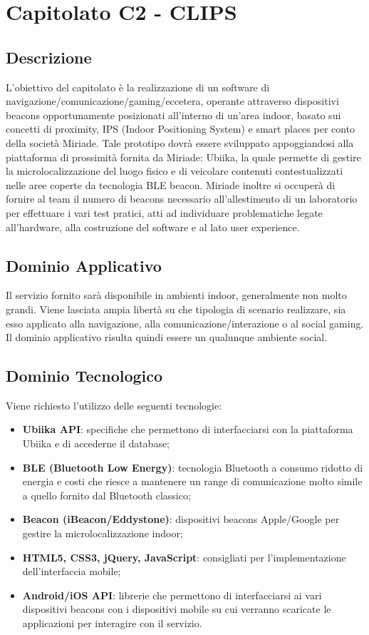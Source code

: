 \section{Capitolato C2 - CLIPS}
\subsection{Descrizione}
L'obiettivo del capitolato è la realizzazione di un software di navigazione/comunicazione/gaming/eccetera, operante attraverso dispositivi beacons opportunamente posizionati all'interno di un'area indoor, basato sui concetti di proximity, IPS (Indoor Positioning System) e smart places per conto della società Miriade. Tale prototipo dovrà essere sviluppato appoggiandosi alla piattaforma di prossimità fornita da Miriade: Ubiika, la quale permette di gestire la microlocalizzazione del luogo fisico e di veicolare contenuti contestualizzati nelle aree coperte da tecnologia BLE beacon. Miriade inoltre si occuperà di fornire al team il numero di beacons necessario all'allestimento di un laboratorio per effettuare i vari test pratici, atti ad individuare problematiche legate all'hardware, alla costruzione del software e al lato user experience.     

\subsection{Dominio Applicativo}
Il servizio fornito sarà disponibile in ambienti indoor, generalmente non molto grandi. Viene lasciata ampia libertà su che tipologia di scenario realizzare, sia esso applicato alla navigazione, alla comunicazione/interazione o al social gaming. Il dominio applicativo risulta quindi essere un qualunque ambiente social. 

\subsection{Dominio Tecnologico}
Viene richiesto l'utilizzo delle seguenti tecnologie:
\begin{itemize}
\item \textbf{Ubiika API}: specifiche che permettono di interfacciarsi con la piattaforma Ubiika e di accederne il database;
\item \textbf{BLE (Bluetooth Low Energy)}: tecnologia Bluetooth a consumo ridotto di energia e costi che riesce a mantenere un range di comunicazione molto simile a quello fornito dal Bluetooth classico;
\item \textbf{Beacon (iBeacon/Eddystone)}: dispositivi beacons Apple/Google per gestire la microlocalizzazione indoor;
\item \textbf{HTML5, CSS3, jQuery, JavaScript}: consigliati per l'implementazione dell'interfaccia mobile;
\item \textbf{Android/iOS API}: librerie che permettono di interfacciarsi ai vari dispositivi beacons con i dispositivi mobile su cui verranno scaricate le applicazioni per interagire con il servizio.
\end{itemize}

